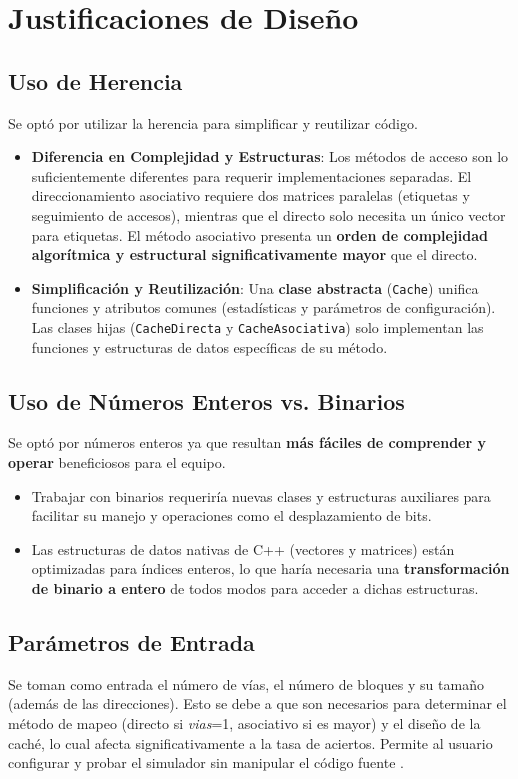 \documentclass{article}
\begin{document}
\section{Justificaciones de Diseño}

\subsection{Uso de Herencia}
Se optó por utilizar la herencia para simplificar y reutilizar código.
\begin{itemize}
    \item \textbf{Diferencia en Complejidad y Estructuras}: Los métodos de acceso son lo suficientemente diferentes para requerir implementaciones separadas. El direccionamiento asociativo requiere dos matrices paralelas (etiquetas y seguimiento de accesos), mientras que el directo solo necesita un único vector para etiquetas. El método asociativo presenta un \textbf{orden de complejidad algorítmica y estructural significativamente mayor} que el directo.
    \item \textbf{Simplificación y Reutilización}: Una \textbf{clase abstracta} (\texttt{Cache}) unifica funciones y atributos comunes (estadísticas y parámetros de configuración). Las clases hijas (\texttt{CacheDirecta} y \texttt{CacheAsociativa}) solo implementan las funciones y estructuras de datos específicas de su método.
\end{itemize}

\subsection{Uso de Números Enteros vs. Binarios}
Se optó por números enteros ya que resultan \textbf{más fáciles de comprender y operar} beneficiosos para el equipo.
\begin{itemize}
    \item Trabajar con binarios requeriría nuevas clases y estructuras auxiliares para facilitar su manejo y operaciones como el desplazamiento de bits.
    \item Las estructuras de datos nativas de C++ (vectores y matrices) están optimizadas para índices enteros, lo que haría necesaria una \textbf{transformación de binario a entero} de todos modos para acceder a dichas estructuras.
\end{itemize}

\subsection{Parámetros de Entrada}
Se toman como entrada el número de vías, el número de bloques y su tamaño (además de las direcciones). Esto se debe a que son necesarios para determinar el método de mapeo (directo si \textit{vias}=1, asociativo si es mayor) y el diseño de la caché, lo cual afecta significativamente a la tasa de aciertos. Permite al usuario configurar y probar el simulador sin manipular el código fuente .
\end{document}
